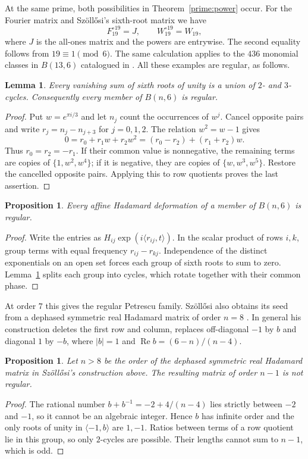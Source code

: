 \documentclass[11pt,a4paper]{article}
\newtheorem{proposition}[theorem]{Proposition}
\newtheorem{lemma}[theorem]{Lemma}
\numberwithin{equation}{section}
\begin{document}
At the same prime, both possibilities in Theorem~\ref{prime:power} occur. For the Fourier matrix and Sz\"oll\H{o}si's sixth-root matrix \cite{sz19} we have
$$F_{19}^{\circ19}=J,\qquad W_{19}^{\circ19}=W_{19},$$
where $J$ is the all-ones matrix and the powers are entrywise. The second equality follows from $19\equiv1\pmod6$. The same calculation applies to the $436$ monomial classes in $B(13,6)$ catalogued in \cite{aalto,los}. All these examples are regular, as follows.
\begin{lemma}\label{prime:sixcycles}
Every vanishing sum of sixth roots of unity is a union of $2$- and $3$-cycles. Consequently every member of $B(n,6)$ is regular.
\end{lemma}
\begin{proof}
Put $w=e^{\pi i/3}$ and let $n_j$ count the occurrences of $w^j$. Cancel opposite pairs and write $r_j=n_j-n_{j+3}$ for $j=0,1,2$. The relation $w^2=w-1$ gives
$$0=r_0+r_1w+r_2w^2=(r_0-r_2)+(r_1+r_2)w.$$
Thus $r_0=r_2=-r_1$. If their common value is nonnegative, the remaining terms are copies of $\{1,w^2,w^4\}$; if it is negative, they are copies of $\{w,w^3,w^5\}$. Restore the cancelled opposite pairs. Applying this to row quotients proves the last assertion.
\end{proof}

\begin{proposition}\label{prime:affine-six}
Every affine Hadamard deformation of a member of $B(n,6)$ is regular.
\end{proposition}
\begin{proof}
Write the entries as $H_{ij}\exp(i\langle r_{ij},t\rangle)$. In the scalar product of rows $i,k$, group terms with equal frequency $r_{ij}-r_{kj}$. Independence of the distinct exponentials on an open set forces each group of sixth roots to sum to zero. Lemma~\ref{prime:sixcycles} splits each group into cycles, which rotate together with their common phase.
\end{proof}

At order $7$ this gives the regular Petrescu family. Sz\"oll\H{o}si also obtains its seed from a dephased symmetric real Hadamard matrix of order $n=8$ \cite[Theorem~4.1]{szexotic}. In general his construction deletes the first row and column, replaces off-diagonal $-1$ by $b$ and diagonal $1$ by $-b$, where $|b|=1$ and $\operatorname{Re} b=(6-n)/(n-4)$.

\begin{proposition}\label{prime:sz-nonregular}
Let $n>8$ be the order of the dephased symmetric real Hadamard matrix in Sz\"oll\H{o}si's construction above. The resulting matrix of order $n-1$ is not regular.
\end{proposition}
\begin{proof}
The rational number $b+b^{-1}=-2+4/(n-4)$ lies strictly between $-2$ and $-1$, so it cannot be an algebraic integer. Hence $b$ has infinite order and the only roots of unity in $\langle -1,b\rangle$ are $1,-1$. Ratios between terms of a row quotient lie in this group, so only $2$-cycles are possible. Their lengths cannot sum to $n-1$, which is odd.
\end{proof}
\end{document}
